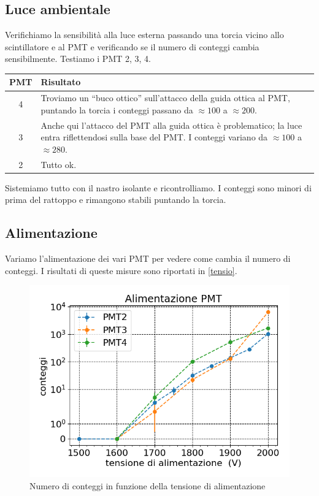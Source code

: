 \documentclass[a4paper]{article}
\begin{document}
\subsection*{Luce ambientale}

Verifichiamo la sensibilità alla luce esterna passando una torcia vicino allo scintillatore e al PMT e verificando se il numero di conteggi cambia sensibilmente.
Testiamo i PMT 2, 3, 4.
\begin{center}
\begin{tabular}{c|p{50ex}}
	PMT & Risultato \\
	\hline
	4 &
	Troviamo un ``buco ottico'' sull'attacco della guida ottica al PMT,
	puntando la torcia i conteggi passano da $\approx 100$ a $\approx 200$. \\
	3 &
	Anche qui l'attacco del PMT alla guida ottica è problematico;
	la luce entra riflettendosi sulla base del PMT.
	I conteggi variano da $\approx 100$ a $\approx 280$.\\
	2 &
	Tutto ok.
\end{tabular}
\end{center}
Sistemiamo tutto con il nastro isolante e ricontrolliamo.
I conteggi sono minori di prima del rattoppo e rimangono stabili puntando la torcia.

\subsection*{Alimentazione}

Variamo l'alimentazione dei vari PMT per vedere come cambia il numero di conteggi. I risultati di queste misure sono  riportati in \autoref{tensio}. 

\begin{figure}[h]
\centering
\includegraphics[width=8 cm]{tensio_pmt}
\caption{Numero di conteggi in funzione della tensione di alimentazione}
\label{tensio}
\end{figure}
\end{document}
